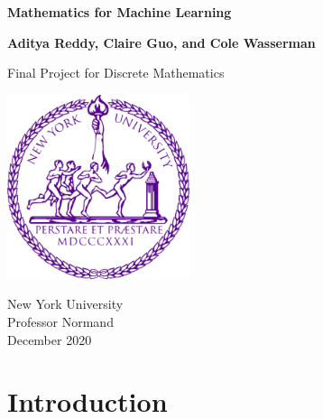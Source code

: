 \documentclass{article}
\begin{document}
\begin{titlepage}
   \begin{center}
       \vspace*{1cm}

       \huge \textbf{Mathematics for Machine Learning}

       \vspace{0.5cm}
        
            
       \vspace{1.5cm}

      
      \large \textbf{Aditya Reddy, Claire Guo, and Cole Wasserman}

      \vspace{35 mm}
            
       Final Project for Discrete Mathematics\\
            
       \vspace{0.8cm}
     
       \includegraphics[width=0.4\textwidth]{university}
        \vspace{20 mm}     
       
       New York University\\
       Professor Normand\\
       December 2020\
            
   \end{center}
\end{titlepage}

\pagestyle{fancy}
\fancyhf{}
\tableofcontents
\newpage

\section{Introduction}
\end{document}
